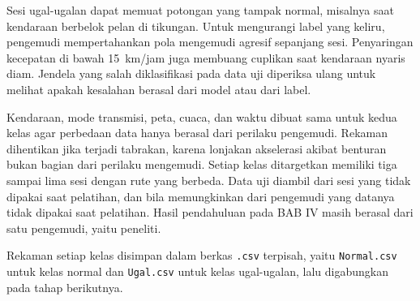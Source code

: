 Sesi ugal-ugalan dapat memuat potongan yang tampak normal, misalnya saat kendaraan berbelok pelan di tikungan. Untuk mengurangi label yang keliru, pengemudi mempertahankan pola mengemudi agresif sepanjang sesi. Penyaringan kecepatan di bawah 15~km/jam juga membuang cuplikan saat kendaraan nyaris diam. Jendela yang salah diklasifikasi pada data uji diperiksa ulang untuk melihat apakah kesalahan berasal dari model atau dari label.

Kendaraan, mode transmisi, peta, cuaca, dan waktu dibuat sama untuk kedua kelas agar perbedaan data hanya berasal dari perilaku pengemudi. Rekaman dihentikan jika terjadi tabrakan, karena lonjakan akselerasi akibat benturan bukan bagian dari perilaku mengemudi. Setiap kelas ditargetkan memiliki tiga sampai lima sesi dengan rute yang berbeda. Data uji diambil dari sesi yang tidak dipakai saat pelatihan, dan bila memungkinkan dari pengemudi yang datanya tidak dipakai saat pelatihan. Hasil pendahuluan pada BAB IV masih berasal dari satu pengemudi, yaitu peneliti.

Rekaman setiap kelas disimpan dalam berkas \texttt{.csv} terpisah, yaitu \texttt{Normal.csv} untuk kelas normal dan \texttt{Ugal.csv} untuk kelas ugal-ugalan, lalu digabungkan pada tahap berikutnya.

